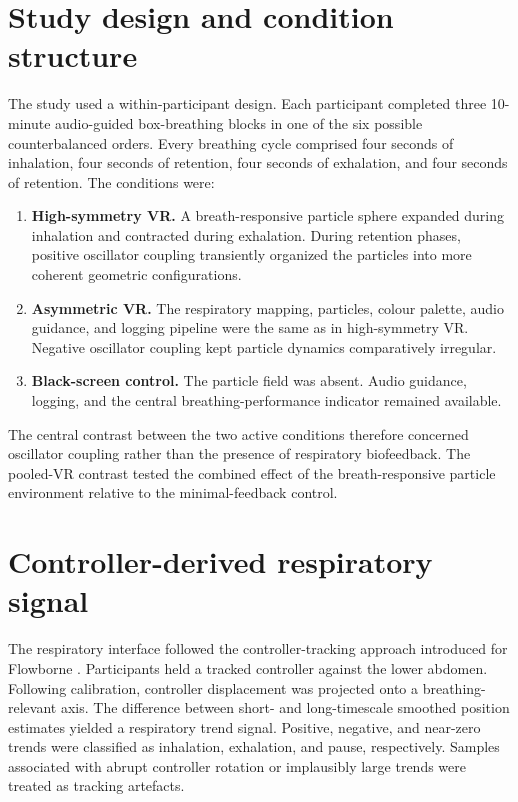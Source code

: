\documentclass[pdflatex,sn-mathphys-num]{sn-jnl}
\begin{document}
\section{Study design and condition structure}

The study used a within-participant design. Each participant completed three 10-minute audio-guided box-breathing blocks in one of the six possible counterbalanced orders. Every breathing cycle comprised four seconds of inhalation, four seconds of retention, four seconds of exhalation, and four seconds of retention. The conditions were:

\begin{enumerate}
\item \textbf{High-symmetry VR.} A breath-responsive particle sphere expanded during inhalation and contracted during exhalation. During retention phases, positive oscillator coupling transiently organized the particles into more coherent geometric configurations.
\item \textbf{Asymmetric VR.} The respiratory mapping, particles, colour palette, audio guidance, and logging pipeline were the same as in high-symmetry VR. Negative oscillator coupling kept particle dynamics comparatively irregular.
\item \textbf{Black-screen control.} The particle field was absent. Audio guidance, logging, and the central breathing-performance indicator remained available.
\end{enumerate}

The central contrast between the two active conditions therefore concerned oscillator coupling rather than the presence of respiratory biofeedback. The pooled-VR contrast tested the combined effect of the breath-responsive particle environment relative to the minimal-feedback control.

\section{Controller-derived respiratory signal}

The respiratory interface followed the controller-tracking approach introduced for Flowborne \citep{rockstroh2021mobile}. Participants held a tracked controller against the lower abdomen. Following calibration, controller displacement was projected onto a breathing-relevant axis. The difference between short- and long-timescale smoothed position estimates yielded a respiratory trend signal. Positive, negative, and near-zero trends were classified as inhalation, exhalation, and pause, respectively. Samples associated with abrupt controller rotation or implausibly large trends were treated as tracking artefacts.
\end{document}
